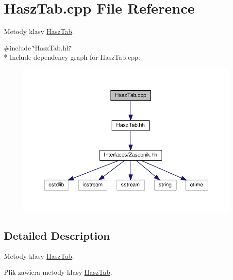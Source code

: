 \hypertarget{a00043}{}\section{Hasz\+Tab.\+cpp File Reference}
\label{a00043}


Metody klasy \hyperlink{a00012}{Hasz\+Tab}.  


{\ttfamily \#include \char`\"{}Hasz\+Tab.\+hh\char`\"{}}\\*
Include dependency graph for Hasz\+Tab.\+cpp\+:
\nopagebreak
\begin{figure}[H]
\begin{center}
\leavevmode
\includegraphics[width=350pt]{a00094}
\end{center}
\end{figure}


\subsection{Detailed Description}
Metody klasy \hyperlink{a00012}{Hasz\+Tab}. 

Plik zawiera metody klasy \hyperlink{a00012}{Hasz\+Tab}. 